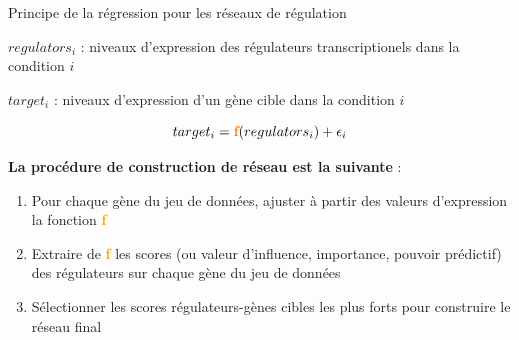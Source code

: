 

\begin{frame}{Principe de la régression pour les réseaux de régulation}
	
	\begin{center}
	\scriptsize 
	$regulators_{i}$ : niveaux d'expression des régulateurs transcriptionels dans la condition $i$
	
	$target_{i}$  : niveaux d'expression d'un gène cible dans la condition $i$
	\end{center}
	\vspace{-0.15cm}
	
	
	\begin{block}{}
	\begin{equation*}
	    target_{i} = \textcolor{orange}{\textbf{f}}(regulators_{i}) + \epsilon_i
	\end{equation*}
	\end{block}
	\vspace{0.25cm}

	\scriptsize 
	
	
	\textbf{La procédure de construction de réseau est la suivante} : 
	
	\begin{enumerate}
	    \item Pour chaque gène du jeu de données, ajuster à partir des valeurs d'expression la fonction \textcolor{orange}{\textbf{f}}
	    \item Extraire de \textcolor{orange}{\textbf{f}} les scores (ou valeur d'influence, importance, pouvoir prédictif) des régulateurs sur chaque gène du jeu de données 
	    \item Sélectionner les scores régulateurs-gènes cibles les plus forts pour construire le réseau final
	\end{enumerate}
\end{frame}



